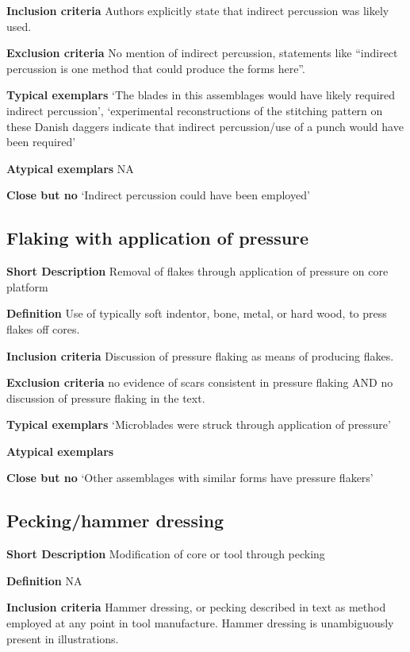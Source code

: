 \documentclass[
]{article}
\begin{document}
\textbf{Inclusion criteria} Authors explicitly state that indirect
percussion was likely used.

\textbf{Exclusion criteria} No mention of indirect percussion,
statements like ``indirect percussion is one method that could produce
the forms here''.

\textbf{Typical exemplars} `The blades in this assemblages would have
likely required indirect percussion', `experimental reconstructions of
the stitching pattern on these Danish daggers indicate that indirect
percussion/use of a punch would have been required'

\textbf{Atypical exemplars} NA

\textbf{Close but no} `Indirect percussion could have been employed'

\hypertarget{flaking-with-application-of-pressure}{%
\subsection{Flaking with application of
pressure}\label{flaking-with-application-of-pressure}}

\textbf{Short Description} Removal of flakes through application of
pressure on core platform

\textbf{Definition} Use of typically soft indentor, bone, metal, or hard
wood, to press flakes off cores.

\textbf{Inclusion criteria} Discussion of pressure flaking as means of
producing flakes.

\textbf{Exclusion criteria} no evidence of scars consistent in pressure
flaking AND no discussion of pressure flaking in the text.

\textbf{Typical exemplars} `Microblades were struck through application
of pressure'

\textbf{Atypical exemplars}

\textbf{Close but no} `Other assemblages with similar forms have
pressure flakers'

\hypertarget{peckinghammer-dressing}{%
\subsection{Pecking/hammer dressing}\label{peckinghammer-dressing}}

\textbf{Short Description} Modification of core or tool through pecking

\textbf{Definition} NA

\textbf{Inclusion criteria} Hammer dressing, or pecking described in
text as method employed at any point in tool manufacture. Hammer
dressing is unambiguously present in illustrations.
\end{document}
